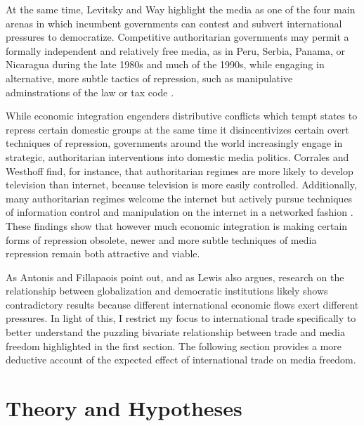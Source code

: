 \documentclass[12pt,a4paper]{article}
\begin{document}
At the same time, Levitsky and Way highlight the media as one of the four main arenas in which incumbent governments can contest and subvert international pressures to democratize. Competitive authoritarian governments may permit a formally independent and relatively free media, as in Peru, Serbia, Panama, or Nicaragua during the late 1980s and much of the 1990s, while engaging in alternative, more subtle tactics of repression, such as manipulative adminstrations of the law or tax code \parencite[53, 58]{Levitsky:2002gx}.

While economic integration engenders distributive conflicts which tempt states to repress certain domestic groups at the same time it disincentivizes certain overt techniques of repression, governments around the world increasingly engage in strategic, authoritarian interventions into domestic media politics. Corrales and Westhoff \parencite*{Corrales:2006vz} find, for instance, that authoritarian regimes are more likely to develop television than internet, because television is more easily controlled. Additionally, many authoritarian regimes welcome the internet but actively pursue techniques of information control and manipulation on the internet in a networked fashion \parencites{MacKinnon:2011id}{Pearce:2012fm}. These findings show that however much economic integration is making certain forms of repression obsolete, newer and more subtle techniques of media repression remain both attractive and viable.

As Antonis and Fillapaois point out, and as Lewis also argues, research on the relationship between globalization and democratic institutions likely shows contradictory results because different international economic flows exert different pressures. In light of this, I restrict my focus to international trade specifically to better understand the puzzling bivariate relationship between trade and media freedom highlighted in the first section. The following section provides a more deductive account of the expected effect of international trade on media freedom.

\section{Theory and Hypotheses}
\end{document}
